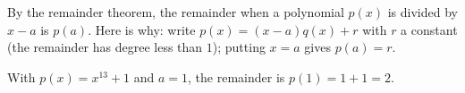 By the remainder theorem, the remainder when a polynomial $p(x)$ is divided by $x-a$ is $p(a)$. Here is why: write $p(x)=(x-a)q(x)+r$ with $r$ a constant (the remainder has degree less than $1$); putting $x=a$ gives $p(a)=r$.

With $p(x)=x^{13}+1$ and $a=1$, the remainder is $p(1)=1+1=\boxed{2}$.
